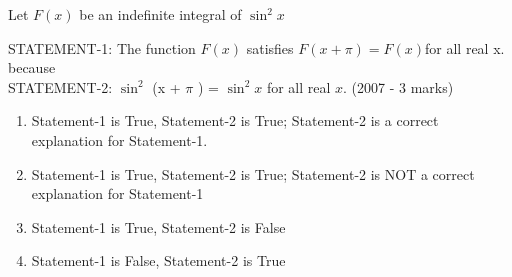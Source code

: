 \iffalse
\title{Assignment}
\author{K.AKSHAY TEJA}
\section{ar}
\fi

\item   Let $F(x)$ be an indefinite integral of $\sin^2 x$

STATEMENT-1: The function $F(x)$ satisfies $F(x+\pi)=F(x)$for all real x. because\\
STATEMENT-2: $\sin^2$ (x + $\pi$ ) = $\sin^2 x$ for all real $x$.   \hfill     (2007 - 3 marks)
  
    \begin{enumerate}
    
 \item Statement-1 is True, Statement-2 is True; Statement-2 is a correct explanation for Statement-1.
\item Statement-1 is True, Statement-2 is True; Statement-2 is NOT a correct explanation for Statement-1
 \item Statement-1 is True, Statement-2 is False
\item Statement-1 is False, Statement-2 is True
\end{enumerate}
